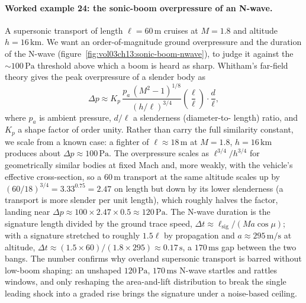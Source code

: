 

\paragraph{Worked example 24: the sonic-boom overpressure of an
N-wave.} A supersonic transport of length $\ell = 60\,\si{\meter}$
cruises at $M = 1.8$ and altitude $h = 16\,\si{\kilo\meter}$. We want an
order-of-magnitude ground overpressure and the duration of the N-wave
(figure~\ref{fig:vol03ch13:sonic-boom-nwave}), to judge it against the
$\sim 100\,\text{Pa}$ threshold above which a boom is heard as sharp.
Whitham's far-field theory gives the peak overpressure of a slender body
as
\[
\Delta p \approx K_p\,\frac{p_a\,(M^2 - 1)^{1/8}}{(h/\ell)^{3/4}}
\left(\frac{\ell}{\ell}\right)\cdot\frac{d}{\ell},
\]
where $p_a$ is ambient pressure, $d/\ell$ a slenderness (diameter-to-
length) ratio, and $K_p$ a shape factor of order unity. Rather than
carry the full similarity constant, we scale from a known case: a
fighter of $\ell \approx 18\,\si{\meter}$ at $M = 1.8$, $h = 16\,\si{
\kilo\meter}$ produces about $\Delta p \approx 100\,\text{Pa}$. The
overpressure scales as $\ell^{3/4}/h^{3/4}$ for geometrically similar
bodies at fixed Mach and, more weakly, with the vehicle's effective
cross-section, so a $60\,\si{\meter}$ transport at the same altitude
scales up by $(60/18)^{3/4} = 3.33^{0.75} = 2.47$ on length but down by
its lower slenderness (a transport is more slender per unit length),
which roughly halves the factor, landing near $\Delta p \approx
100\times 2.47\times 0.5 \approx 120\,\text{Pa}$. The N-wave duration is
the signature length divided by the ground trace speed,
$\Delta t \approx \ell_{\text{sig}}/(M a\cos\mu)$; with a signature
stretched to roughly $1.5\ell$ by propagation and
$a \approx 295\,\si{\meter\per\second}$ at altitude,
$\Delta t \approx (1.5\times 60)/(1.8\times 295) \approx 0.17\,\text{s}$,
a $170\,\text{ms}$ gap between the two bangs. The number confirms why
overland supersonic transport is barred without low-boom shaping: an
unshaped $120\,\text{Pa}$, $170\,\text{ms}$ N-wave startles and rattles
windows, and only reshaping the area-and-lift distribution to break the
single leading shock into a graded rise brings the signature under a
noise-based ceiling.



